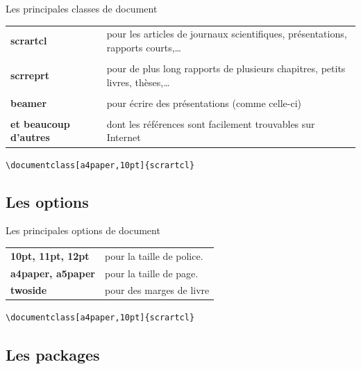 \begin{frame}[fragile]{Les principales classes de document}
  \begin{tabular}{p{}p{}}
    \textbf{scrartcl} & pour les articles de journaux scientifiques, présentations, rapports courts,\dots \\ \\
    \textbf{scrreprt} & pour de plus long rapports de plusieurs chapitres, petits livres, thèses,\dots \\ \\
    \textbf{beamer} & pour écrire des présentations (comme celle-ci) \\ \\
    \textbf{et beaucoup d'autres} & dont les références sont facilement trouvables sur Internet
  \end{tabular}
  \begin{center}
  \verb|\documentclass[a4paper,10pt]{|\alert{\texttt{scrartcl}}\verb|}|\\
  \end{center}
\end{frame}

\subsection{Les options}

\begin{frame}[fragile]{Les principales options de document}
  \begin{tabular}{lp{8cm}}
    \textbf{10pt, 11pt, 12pt} & pour la taille de police.\\
    \textbf{a4paper, a5paper} & pour la taille de page.\\
    \textbf{twoside} & pour des marges de livre
  \end{tabular}
  \vspace{1cm}
  \begin{center}
  \verb|\documentclass[|\alert{\texttt{a4paper,10pt}}\verb|]{scrartcl}|\\
  \end{center}
\end{frame}

\subsection{Les packages}

